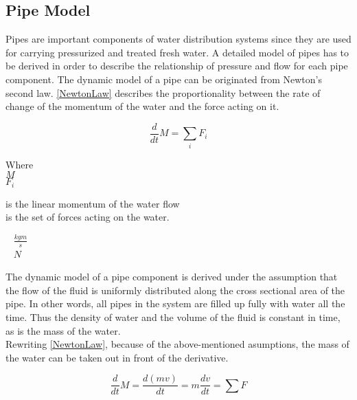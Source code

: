 \subsection{Pipe Model} 
\label{PipeModel}
Pipes are important components of water distribution systems since they are used for carrying pressurized and treated fresh water. A detailed model of pipes has to be derived in order to describe the relationship of pressure and flow for each pipe component.  
%
The dynamic model of a pipe can be originated from Newton's second law. \eqref{NewtonLaw} describes the proportionality between the rate of change of the momentum of the water and the force acting on it.

\begin{equation}
  \frac{d}{dt} M = \sum_i F_i
  \label{NewtonLaw}
\end{equation} 

\begin{minipage}[t]{0.20\textwidth}
Where\\
\hspace*{8mm} $M$ \\
\hspace*{8mm} $F_i$ 
\end{minipage}
\begin{minipage}[t]{0.68\textwidth}
\vspace*{2mm}
is the linear momentum of the water flow\\
is the set of forces acting on the water.
\end{minipage}
\begin{minipage}[t]{0.10\textwidth}
\vspace*{2mm}
\textcolor{White}{te}$\unit{\frac{kgm}{s}}$\\
\textcolor{White}{te}$\unit{N}$
\end{minipage}

The dynamic model of a pipe component is derived under the assumption that the flow of the fluid is uniformly distributed along the cross sectional area of the pipe. In other words, all pipes in the system are filled up fully with water all the time. Thus the density of water and the volume of the fluid is constant in time, as is the mass of the water.
\\
Rewriting \eqref{NewtonLaw}, because of the above-mentioned asumptions, the mass of the water can be taken out in front of the derivative.

\begin{equation}
  \frac{d}{dt} M = {\frac{d(m v)}{dt}} = m \frac{dv}{dt} = \sum F
\end{equation} 


